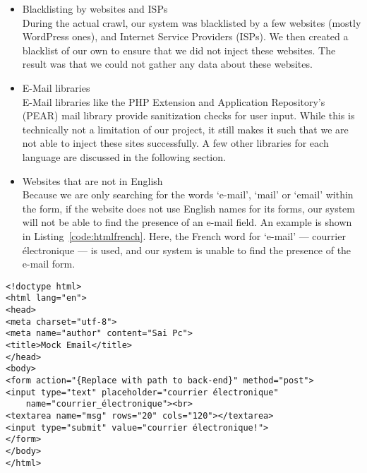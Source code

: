 \begin{itemize}
		\item Blacklisting by websites and ISPs\\
        During the actual crawl, our system was blacklisted by a few websites (mostly WordPress ones), and Internet Service Providers (ISPs). We then created a blacklist of our own to ensure that we did not inject these websites. The result was that we could not gather any data about these websites.
		
		\item E-Mail libraries\\
        E-Mail libraries like the PHP Extension and Application Repository's (PEAR) mail library provide sanitization checks for user input. While this is technically not a limitation of our project, it still makes it such that we are not able to inject these sites successfully.
        A few other libraries for each language are discussed in the following section.
        
        \item Websites that are not in English\\
        Because we are only searching for the words `e-mail', `mail' or `email' within the form, if the website does not use English names for its forms, our system will not be able to find the presence of an e-mail field. An example is shown in Listing~\ref{code:htmlfrench}. Here, the French word for `e-mail' --- courrier électronique --- is used, and our system is unable to find the presence of the e-mail form.
	\end{itemize}
	
\begin{lstlisting}
<!doctype html>
<html lang="en">
<head>
<meta charset="utf-8">
<meta name="author" content="Sai Pc">
<title>Mock Email</title>
</head>
<body>
<form action="{Replace with path to back-end}" method="post">
<input type="text" placeholder="courrier électronique" 
	name="courrier_électronique"><br>
<textarea name="msg" rows="20" cols="120"></textarea>
<input type="submit" value="courrier électronique!">
</form>
</body>
</html>
\end{lstlisting}
